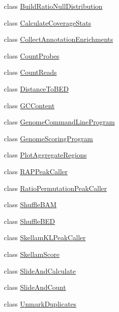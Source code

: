\begin{DoxyCompactItemize}
\item 
class \hyperlink{classbroad_1_1pda_1_1seq_1_1rap_1_1_build_ratio_null_distribution}{Build\+Ratio\+Null\+Distribution}
\item 
class \hyperlink{classbroad_1_1pda_1_1seq_1_1rap_1_1_calculate_coverage_stats}{Calculate\+Coverage\+Stats}
\item 
class \hyperlink{classbroad_1_1pda_1_1seq_1_1rap_1_1_collect_annotation_enrichments}{Collect\+Annotation\+Enrichments}
\item 
class \hyperlink{classbroad_1_1pda_1_1seq_1_1rap_1_1_count_probes}{Count\+Probes}
\item 
class \hyperlink{classbroad_1_1pda_1_1seq_1_1rap_1_1_count_reads}{Count\+Reads}
\item 
class \hyperlink{classbroad_1_1pda_1_1seq_1_1rap_1_1_distance_to_b_e_d}{Distance\+To\+B\+E\+D}
\item 
class \hyperlink{classbroad_1_1pda_1_1seq_1_1rap_1_1_g_c_content}{G\+C\+Content}
\item 
class \hyperlink{classbroad_1_1pda_1_1seq_1_1rap_1_1_genome_command_line_program}{Genome\+Command\+Line\+Program}
\item 
class \hyperlink{classbroad_1_1pda_1_1seq_1_1rap_1_1_genome_scoring_program}{Genome\+Scoring\+Program}
\item 
class \hyperlink{classbroad_1_1pda_1_1seq_1_1rap_1_1_plot_aggregate_regions}{Plot\+Aggregate\+Regions}
\item 
class \hyperlink{classbroad_1_1pda_1_1seq_1_1rap_1_1_r_a_p_peak_caller}{R\+A\+P\+Peak\+Caller}
\item 
class \hyperlink{classbroad_1_1pda_1_1seq_1_1rap_1_1_ratio_permutation_peak_caller}{Ratio\+Permutation\+Peak\+Caller}
\item 
class \hyperlink{classbroad_1_1pda_1_1seq_1_1rap_1_1_shuffle_b_a_m}{Shuffle\+B\+A\+M}
\item 
class \hyperlink{classbroad_1_1pda_1_1seq_1_1rap_1_1_shuffle_b_e_d}{Shuffle\+B\+E\+D}
\item 
class \hyperlink{classbroad_1_1pda_1_1seq_1_1rap_1_1_skellam_k_l_peak_caller}{Skellam\+K\+L\+Peak\+Caller}
\item 
class \hyperlink{classbroad_1_1pda_1_1seq_1_1rap_1_1_skellam_score}{Skellam\+Score}
\item 
class \hyperlink{classbroad_1_1pda_1_1seq_1_1rap_1_1_slide_and_calculate}{Slide\+And\+Calculate}
\item 
class \hyperlink{classbroad_1_1pda_1_1seq_1_1rap_1_1_slide_and_count}{Slide\+And\+Count}
\item 
class \hyperlink{classbroad_1_1pda_1_1seq_1_1rap_1_1_unmark_duplicates}{Unmark\+Duplicates}
\end{DoxyCompactItemize}
